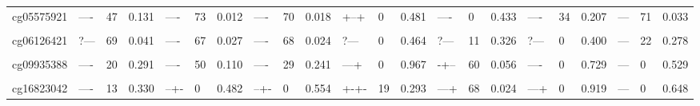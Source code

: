 \documentclass[11pt,oneside]{bristolthesis}
\begin{document}
\begin{landscape}
\begin{table}[!h]
{\begin{tabular}[t]{llllllllllllllllllllll}
cg05575921 & ---- & 47 & 0.131 & ---- & 73 & 0.012 & ---- & 70 & 0.018 & +--+ & 0 & 0.481 & ---- & 0 & 0.433 & ---- & 34 & 0.207 & --- & 71 & 0.033\\
\cellcolor{gray!6}{cg05951221} & \cellcolor{gray!6}{----} & \cellcolor{gray!6}{45} & \cellcolor{gray!6}{0.139} & \cellcolor{gray!6}{----} & \cellcolor{gray!6}{61} & \cellcolor{gray!6}{0.053} & \cellcolor{gray!6}{----} & \cellcolor{gray!6}{54} & \cellcolor{gray!6}{0.092} & \cellcolor{gray!6}{--++} & \cellcolor{gray!6}{0} & \cellcolor{gray!6}{0.862} & \cellcolor{gray!6}{----} & \cellcolor{gray!6}{33} & \cellcolor{gray!6}{0.217} & \cellcolor{gray!6}{----} & \cellcolor{gray!6}{15} & \cellcolor{gray!6}{0.315} & \cellcolor{gray!6}{---} & \cellcolor{gray!6}{44} & \cellcolor{gray!6}{0.168}\\
\addlinespace
cg06126421 & ?--- & 69 & 0.041 & ---- & 67 & 0.027 & ---- & 68 & 0.024 & ?--- & 0 & 0.464 & ?--- & 11 & 0.326 & ?--- & 0 & 0.400 & --- & 22 & 0.278\\
\cellcolor{gray!6}{cg08709672} & \cellcolor{gray!6}{----} & \cellcolor{gray!6}{12} & \cellcolor{gray!6}{0.333} & \cellcolor{gray!6}{----} & \cellcolor{gray!6}{52} & \cellcolor{gray!6}{0.101} & \cellcolor{gray!6}{----} & \cellcolor{gray!6}{57} & \cellcolor{gray!6}{0.071} & \cellcolor{gray!6}{--++} & \cellcolor{gray!6}{55} & \cellcolor{gray!6}{0.085} & \cellcolor{gray!6}{---+} & \cellcolor{gray!6}{0} & \cellcolor{gray!6}{0.584} & \cellcolor{gray!6}{---+} & \cellcolor{gray!6}{0} & \cellcolor{gray!6}{0.735} & \cellcolor{gray!6}{---} & \cellcolor{gray!6}{0} & \cellcolor{gray!6}{0.657}\\
cg09935388 & ---- & 20 & 0.291 & ---- & 50 & 0.110 & ---- & 29 & 0.241 & ---+ & 0 & 0.967 & -+-- & 60 & 0.056 & ---- & 0 & 0.729 & --- & 0 & 0.529\\
\cellcolor{gray!6}{cg11660018} & \cellcolor{gray!6}{----} & \cellcolor{gray!6}{0} & \cellcolor{gray!6}{0.476} & \cellcolor{gray!6}{----} & \cellcolor{gray!6}{7} & \cellcolor{gray!6}{0.358} & \cellcolor{gray!6}{----} & \cellcolor{gray!6}{0} & \cellcolor{gray!6}{0.455} & \cellcolor{gray!6}{+-++} & \cellcolor{gray!6}{0} & \cellcolor{gray!6}{0.699} & \cellcolor{gray!6}{----} & \cellcolor{gray!6}{9} & \cellcolor{gray!6}{0.349} & \cellcolor{gray!6}{----} & \cellcolor{gray!6}{0} & \cellcolor{gray!6}{0.557} & \cellcolor{gray!6}{---} & \cellcolor{gray!6}{16} & \cellcolor{gray!6}{0.305}\\
cg16823042 & ---- & 13 & 0.330 & --+- & 0 & 0.482 & --+- & 0 & 0.554 & +-+- & 19 & 0.293 & ---+ & 68 & 0.024 & ---+ & 0 & 0.919 & --- & 0 & 0.648\\

\end{tabular}}
\end{table}
\end{landscape}
\end{document}

